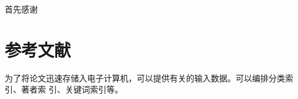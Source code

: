 \documentclass{zhbook}
\begin{document}
\tableofcontents

\listoffigures

\listoftables

\mainmatter













\begin{acknowledgement}
  首先感谢
\end{acknowledgement}

\appendix

% 

\section{参考文献}

为了将论文迅速存储入电子计算机，可以提供有关的输入数据。可以编排分类索引、著者索
引、关键词索引等。

\nocite{*}

%
%

\appendix


\end{document}
